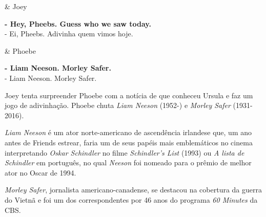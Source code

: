 \begin{tcolorbox}[enhanced,center upper,
    drop fuzzy shadow southeast, boxrule=0.3pt,
    lower separated=false, breakable,
    colframe=black!30!dialogoBorder,colback=white]
\begin{minipage}[c]{0.16\linewidth}
   & \centering \scriptsize{Joey}
\end{minipage}
\hfill
\begin{minipage}[c]{0.8\linewidth}
  \textbf{- Hey, Pheebs. Guess who we saw today.}\\
  - Ei, Pheebs. Adivinha quem vimos hoje.
\end{minipage}

\medskip
\begin{minipage}[c]{0.16\linewidth}
   & \centering \scriptsize{Phoebe}
\end{minipage}
\hfill
\begin{minipage}[c]{0.8\linewidth}
  \textbf{- Liam Neeson. Morley Safer.}\\
  - Liam Neeson. Morley Safer.
\end{minipage}
\end{tcolorbox}

Joey tenta surpreender Phoebe com a notícia de que conheceu Ursula e faz
um jogo de adivinhação. Phoebe chuta \emph{Liam Neeson} (1952-) e
\emph{Morley Safer} (1931-2016).

\emph{Liam Neeson} é um ator norte-americano de ascendência irlandese
que, um ano antes de Friends estrear, faria um de seus papéis mais
emblemáticos no cinema interpretando \emph{Oskar Schindler} no filme
\emph{Schindler's List} (1993) ou \emph{A lista de Schindler} em
português, no qual \emph{Neeson} foi nomeado para o prêmio de melhor
ator no Oscar de 1994.

\emph{Morley Safer}, jornalista americano-canadense, se destacou na
cobertura da guerra do Vietnã e foi um dos correspondentes por 46 anos
do programa \emph{60 Minutes} da CBS.

